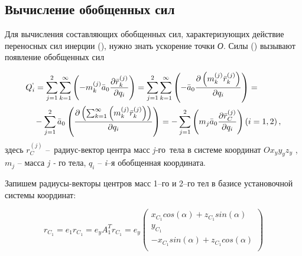 \subsection{Вычисление обобщенных сил} \label{sec:ch3/sec7}

Для вычисления составляющих обобщенных сил, характеризующих действие переносных сил инерции (), нужно знать ускорение точки \textit{О}. Силы () вызывают появление обобщенных сил\par

\begin{equation} %
\label{eq:p3:29}
\begin{multlined}
Q_{i}^{`}= 
\sum _{j=1}^{2} \sum _{k=1}^{\infty} \left( -m_{k}^{ \left( j \right) }\bar{a}_{0} \frac{ \partial \bar{r}_{k}^{ \left( j \right) }}{ \partial q_{i}} \right) = 
\sum _{j=1}^{2} \sum _{k=1}^{\infty} \left( -\bar{a}_{0} \frac{ \partial  \left( m_{k}^{ \left( j \right) }\bar{r}_{k}^{ \left( j \right) } \right) }{ \partial q_{i}} \right) = \\
- \sum _{j=1}^{2}\bar{a}_{0}  \left( \frac{ \partial  \left(  \sum _{k=1}^{\infty} \left( m_{k}^{ \left( j \right) }\bar{r}_{k}^{ \left( j \right) } \right)  \right) }{ \partial q_{i}} \right) =
- \sum _{j=1}^{2} \left( m_{j}\bar{a}_{0} \frac{ \partial \bar{r}_{C}^{ \left( j \right) }}{ \partial q_{i}} \right)  \left( i=1,2 \right) ,
\end{multlined}
\end{equation}
здесь  \( r_{C}^{ \left( j \right) } \) –\ радиус-вектор центра масс  \textit{j-}го\  тела в системе координат  \( Ox_{y}y_{y}z_{y} \) ,  \( m_{j} \) – масса \textit{j - }го тела,  \( q_{i} \) – \textit{i}–я обобщенная координата. \par

Запишем радиусы-векторы центров масс 1–го и 2–го тел в базисе установочной системы координат: \par


\begin{equation} %
r_{C_{1}}=e_{1}r_{C_{1}}=e_{y}A_{1}^{T}r_{C_{1}}=e_{y} \left( \begin{matrix}
x_{C_{1}}cos \left(  \alpha  \right) +z_{C_{1}}sin \left(  \alpha  \right) \\
y_{C_{1}}\\
-x_{C_{1}}sin \left(  \alpha  \right) +z_{C_{1}}cos \left(  \alpha  \right) \\
\end{matrix}
\right) 
\end{equation}

